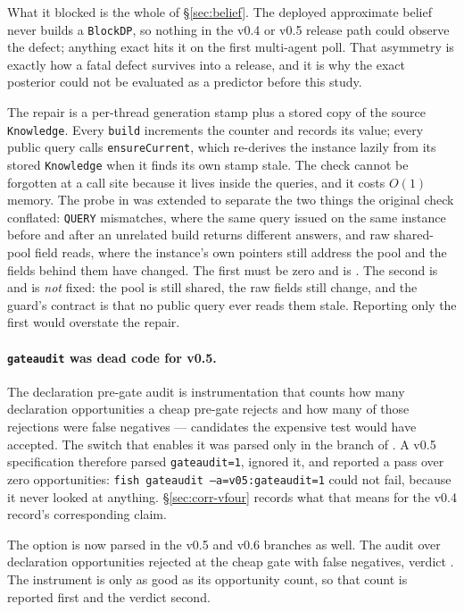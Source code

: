 What it blocked is the whole of \S\ref{sec:belief}. The deployed approximate
belief never builds a \texttt{BlockDP}, so nothing in the v0.4 or v0.5 release
path could observe the defect; anything exact hits it on the first
multi-agent poll. That asymmetry is exactly how a fatal defect survives into a
release, and it is why the exact posterior could not be evaluated as a predictor
before this study.

The repair is a per-thread generation stamp plus a stored copy of the source
\texttt{Knowledge}. Every \texttt{build} increments the counter and records its
value; every public query calls \texttt{ensureCurrent}, which re-derives the
instance lazily from its stored \texttt{Knowledge} when it finds its own stamp
stale. The check cannot be forgotten at a call site because it lives inside the
queries, and it costs $O(1)$ memory. The probe in
 was extended to separate the two
things the original check conflated: \texttt{QUERY} mismatches, where the same
query issued on the same instance before and after an unrelated build returns
different answers, and raw shared-pool field reads, where the instance's own
pointers still address the pool and the fields behind them have changed. The
first must be zero and is \vsixAliasQueryMismatch{}. The second is
\vsixAliasRawMismatch{} and is \emph{not} fixed: the pool is still shared, the
raw fields still change, and the guard's contract is that no public query ever
reads them stale. Reporting only the first would overstate the repair.

\paragraph{\texttt{gateaudit} was dead code for v0.5.}
The declaration pre-gate audit is instrumentation that counts how many
declaration opportunities a cheap pre-gate rejects and how many of those
rejections were false negatives --- candidates the expensive test would have
accepted. The switch that enables it was parsed only in the \vfour{} branch of
. A v0.5 specification therefore parsed
\texttt{gateaudit=1}, ignored it, and reported a pass over zero opportunities:
\texttt{fish gateaudit --a=v05:gateaudit=1} could not fail, because it never
looked at anything. \S\ref{sec:corr-vfour} records what that means for the v0.4
record's corresponding claim.

The option is now parsed in the v0.5 and v0.6 branches as well. The audit over
\vsixGateOpportunities{} declaration opportunities rejected \vsixGateRejected{}
at the cheap gate with \vsixGateFalseNeg{} false negatives, verdict
\vsixGateVerdict{}. The instrument is only as good as its opportunity count, so
that count is reported first and the verdict second.

